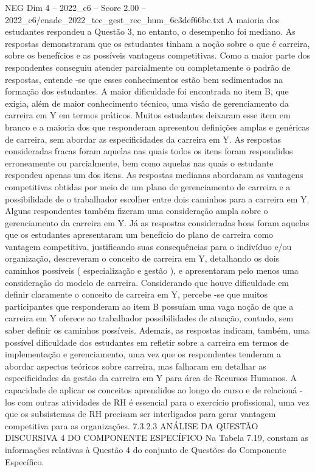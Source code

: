 \begin{textsample}{NEG Dim 4 – 2022\_c6 – Score 2.00 – 2022\_c6/enade\_2022\_tec\_gest\_rec\_hum\_6c3def66be.txt}
A maioria dos estudantes respondeu a Questão 3, no entanto, o desempenho foi mediano.
As respostas demonstraram que os estudantes tinham a noção sobre o que é carreira, sobre os benefícios e as possíveis vantagens competitivas.
Como a maior parte dos respondentes conseguiu atender parcialmente ou completamente o padrão de respostas, entende -se que esses conhecimentos estão bem sedimentados na formação dos estudantes.
A maior dificuldade foi encontrada no item B, que exigia, além de maior conhecimento técnico, uma visão de gerenciamento da carreira em Y em termos práticos.
Muitos estudantes deixaram esse item em branco e a maioria dos que responderam apresentou definições amplas e genéricas de carreira, sem abordar as especificidades da carreira em Y.
As respostas consideradas fracas foram aquelas nas quais todos os itens foram respondidos erroneamente ou parcialmente, bem como aquelas nas quais o estudante respondeu apenas um dos itens.
As respostas medianas abordaram as vantagens competitivas obtidas por meio de um plano de gerenciamento de carreira e a possibilidade de o trabalhador escolher entre dois caminhos para a carreira em Y.
Alguns respondentes também fizeram uma consideração ampla sobre o gerenciamento da carreira em Y.
Já as respostas consideradas boas foram aquelas que os estudantes apresentaram um benefício do plano de carreira como vantagem competitiva, justificando suas consequências para o indivíduo e/ou organização, descreveram o conceito de carreira em Y, detalhando os dois caminhos possíveis ( especialização e gestão ), e apresentaram pelo menos uma consideração do modelo de carreira.
Considerando que houve dificuldade em definir claramente o conceito de carreira em Y, percebe -se que muitos participantes que responderam ao item B possuíam uma vaga noção de que a carreira em Y oferece ao trabalhador possibilidades de atuação, contudo, sem saber definir os caminhos possíveis.
Ademais, as respostas indicam, também, uma possível dificuldade dos estudantes em refletir sobre a carreira em termos de implementação e gerenciamento, uma vez que os respondentes tenderam a abordar aspectos teóricos sobre carreira, mas falharam em detalhar as especificidades da gestão da carreira em Y para área de Recursos Humanos.
A capacidade de aplicar os conceitos aprendidos ao longo do curso e de relacioná -los com outras atividades de RH é essencial para o exercício profissional, uma vez que os subsistemas de RH precisam ser interligados para gerar vantagem competitiva para as organizações. 7.3.2.3 ANÁLISE DA QUESTÃO DISCURSIVA 4 DO COMPONENTE ESPECÍFICO Na Tabela 7.19, constam as informações relativas à Questão 4 do conjunto de Questões do Componente Específico.

\end{textsample}
